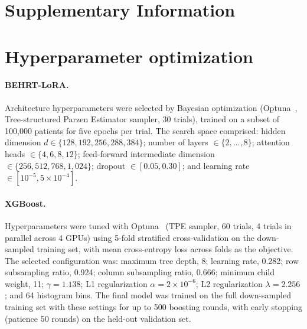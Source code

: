 \documentclass[12pt]{article}
\begin{document}



\clearpage
\section*{Supplementary Information}
\setcounter{section}{0}
\setcounter{table}{0}
\setcounter{figure}{0}
\renewcommand{\thesection}{S\arabic{section}}
\renewcommand{\thetable}{S\arabic{table}}
\renewcommand{\thefigure}{S\arabic{figure}}

\section{Hyperparameter optimization}
\label{supp:hyperparams}

\paragraph{BEHRT-LoRA.}
Architecture hyperparameters were selected by Bayesian optimization (Optuna~\citep{Akiba2019Optuna}, Tree-structured Parzen Estimator sampler, 30 trials), trained on a subset of 100{,}000 patients for five epochs per trial. The search space comprised: hidden dimension $d \in \{128, 192, 256, 288, 384\}$; number of layers $\in \{2,\dots,8\}$; attention heads $\in \{4, 6, 8, 12\}$; feed-forward intermediate dimension $\in \{256, 512, 768, 1{,}024\}$; dropout $\in [0.05, 0.30]$; and learning rate $\in [10^{-5}, 5\times 10^{-4}]$.

\paragraph{XGBoost.}
Hyperparameters were tuned with Optuna~\citep{Akiba2019Optuna} (TPE sampler, 60 trials, 4 trials in parallel across 4 GPUs) using 5-fold stratified cross-validation on the down-sampled training set, with mean cross-entropy loss across folds as the objective. The selected configuration was: maximum tree depth, 8; learning rate, 0.282; row subsampling ratio, 0.924; column subsampling ratio, 0.666; minimum child weight, 11; $\gamma = 1.138$; L1 regularization $\alpha = 2 \times 10^{-6}$; L2 regularization $\lambda = 2.256$; and 64 histogram bins. The final model was trained on the full down-sampled training set with these settings for up to 500 boosting rounds, with early stopping (patience 50 rounds) on the held-out validation set.
\end{document}
